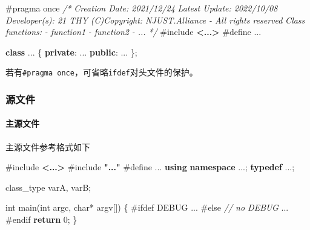 \documentclass[
]{article}
\newenvironment{Shaded}{}{}
\newcommand{\CommentTok}[1]{\textcolor[rgb]{0.38,0.63,0.69}{\textit{#1}}}
\newcommand{\ControlFlowTok}[1]{\textcolor[rgb]{0.00,0.44,0.13}{\textbf{#1}}}
\newcommand{\DataTypeTok}[1]{\textcolor[rgb]{0.56,0.13,0.00}{#1}}
\newcommand{\DecValTok}[1]{\textcolor[rgb]{0.25,0.63,0.44}{#1}}
\newcommand{\ImportTok}[1]{\textcolor[rgb]{0.00,0.50,0.00}{\textbf{#1}}}
\newcommand{\KeywordTok}[1]{\textcolor[rgb]{0.00,0.44,0.13}{\textbf{#1}}}
\newcommand{\NormalTok}[1]{#1}
\newcommand{\OperatorTok}[1]{\textcolor[rgb]{0.40,0.40,0.40}{#1}}
\newcommand{\PreprocessorTok}[1]{\textcolor[rgb]{0.74,0.48,0.00}{#1}}
\begin{document}
\begin{Shaded}
\begin{Highlighting}[]
\PreprocessorTok{\#pragma once}
\CommentTok{/*}
\CommentTok{Creation Date: 2021/12/24}
\CommentTok{Latest Update: 2022/10/08}
\CommentTok{Developer(s): 21 THY}
\CommentTok{(C)Copyright: NJUST.Alliance {-} All rights reserved}
\CommentTok{Class functions:}
\CommentTok{{-} function1}
\CommentTok{{-} function2}
\CommentTok{{-} ...}
\CommentTok{*/}
\PreprocessorTok{\#include }\ImportTok{\textless{}...\textgreater{}}
\PreprocessorTok{\#define ...}

\KeywordTok{class} \OperatorTok{...} \OperatorTok{\{}
\KeywordTok{private}\OperatorTok{:}
    \OperatorTok{...}
\KeywordTok{public}\OperatorTok{:}
    \OperatorTok{...}
\OperatorTok{\};}
\end{Highlighting}
\end{Shaded}

若有\texttt{\#pragma\ once}，可省略\texttt{ifdef}对头文件的保护。

\hypertarget{ux6e90ux6587ux4ef6}{%
\subsubsection{源文件}\label{ux6e90ux6587ux4ef6}}

\hypertarget{ux4e3bux6e90ux6587ux4ef6}{%
\paragraph{主源文件}\label{ux4e3bux6e90ux6587ux4ef6}}

主源文件参考格式如下

\begin{Shaded}
\begin{Highlighting}[]
\PreprocessorTok{\#include }\ImportTok{\textless{}...\textgreater{}}
\PreprocessorTok{\#include }\ImportTok{"..."}
\PreprocessorTok{\#define ...}
\KeywordTok{using} \KeywordTok{namespace} \OperatorTok{...;}
\KeywordTok{typedef} \OperatorTok{...;}

\DataTypeTok{class\_type}\NormalTok{ varA}\OperatorTok{,}\NormalTok{ varB}\OperatorTok{;}

\DataTypeTok{int}\NormalTok{ main}\OperatorTok{(}\DataTypeTok{int}\NormalTok{ argc}\OperatorTok{,} \DataTypeTok{char}\OperatorTok{*}\NormalTok{ argv}\OperatorTok{[])} \OperatorTok{\{}
\PreprocessorTok{\#ifdef DEBUG}
    \OperatorTok{...}
\PreprocessorTok{\#else }\CommentTok{// no DEBUG}
    \OperatorTok{...}
\PreprocessorTok{\#endif}
    \ControlFlowTok{return} \DecValTok{0}\OperatorTok{;}
\OperatorTok{\}}
\end{Highlighting}
\end{Shaded}
\end{document}
